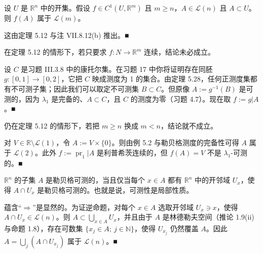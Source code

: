 \begin{corollary}

设 $ U $ 是 $ \mathbb{R}^n $ 中的开集。假设 $ f \in C^1(U, \mathbb{R}^m) $ 且 $ m \ge n $，$ A \in \mathcal{L}(n) $ 且 $ A \subset U $。则 $ f(A) $ 属于 $ \mathcal{L}(m) $。

\proofhead
这由定理 5.12 与注 VII.8.12(b) 推出。\nobreak\hspace{0.35em}■
\end{corollary}

\begin{remark}

\begin{items}
\item

在定理 5.12 的情形下，若只要求 $ f: N \to \mathbb{R}^m $ 连续，结论未必成立。

\proofhead
设 $ C $ 是习题 III.3.8 中的康托尔集。在习题 17 中你将证明存在同胚 $ g: [0, 1] \to [0, 2] $，它把 $ C $ 映成测度为 1 的集合。由定理 5.28，任何正测度集都有不可测子集；因此我们可以取定不可测集 $ B \subset C $。但原像 $ A := g^{-1}(B) $ 是可测的，因为 $ \lambda_1 $ 是完备的、$ A \subset C $，且 $ C $ 的测度为零（习题 4.7）。现在取 $ f := g|A $。\nobreak\hspace{0.35em}■
\item

仍在定理 5.12 的情形下，若把 $ m \ge n $ 换成 $ m < n $，结论就不成立。

\proofhead
对 $ V \in \mathbb{R} \setminus \mathcal{L}(1) $，令 $ A := V \times \{0\} $。则由例 5.2 与勒贝格测度的完备性可得 $ A $ 属于 $ \mathcal{L}(2) $。此外 $ f := \operatorname{pr}_1|A $ 是利普希茨连续的，但 $ f(A) = V $ 不是 $ \lambda_1 $-可测的。\nobreak\hspace{0.35em}■
\item

$ \mathbb{R}^n $ 的子集 $ A $ 是勒贝格可测的，当且仅当每个 $ x \in A $ 都有 $ \mathbb{R}^n $ 中的开邻域 $ U_x $，使得 $ A \cap U_x $ 是勒贝格可测的。也就是说，可测性是局部性质。

\proofhead
蕴含“$ \Rightarrow $”是显然的。为证逆命题，对每个 $ x \in A $ 选取开邻域 $ U_x \ni x $，使得 $ A \cap U_x \in \mathcal{L}(n) $。则 $ A \subset \bigcup_{x \in A} U_x $，并且由于 $ A $ 是林德勒夫空间（推论 1.9(ii) 与命题 1.8），存在可数集 $ \{ x_j \in A ; \ j \in \mathbb{N} \} $，使得 $ U_{x_j} $ 仍然覆盖 $ A $。因此 $ A = \bigcup_j (A \cap U_{x_j}) $ 属于 $ \mathcal{L}(n) $。\nobreak\hspace{0.35em}■
\end{items}

\end{remark}

